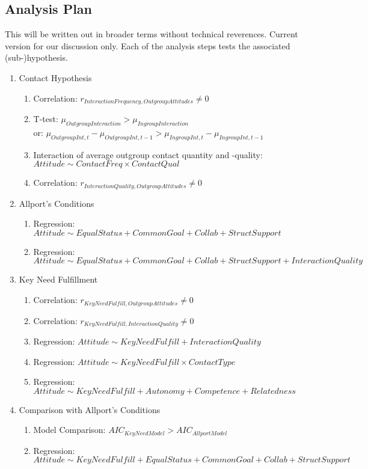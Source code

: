 \documentclass[nobib]{tufte-handout}
\theoremstyle{break}
\theoremstyle{plain}
\begin{document}
\subsection{Analysis Plan}
This will be written out in broader terms without technical reverences. Current version for our discussion only.
Each of the analysis steps tests the associated (sub-)hypothesis.
\begin{enumerate}
    \item Contact Hypothesis
    \begin{enumerate}
        \item Correlation: $r_{InteractionFrequency, OutgroupAttitudes} \neq 0$  
        \item T-test: $\mu_{OutgroupInteraction} > \mu_{IngroupInteraction}$ \\ 
            \hspace{.75em}or: $\mu_{OutgroupInt, t} - \mu_{OutgroupInt, t-1} > \mu_{IngroupInt, t} - \mu_{IngroupInt, t-1}$
        \item Interaction of average outgroup contact quantity and -quality: \\
            \hspace{.75em}$Attitude \sim ContactFreq \times ContactQual$
        \item Correlation: $r_{InteractionQuality, OutgroupAttitudes} \neq 0$
    \end{enumerate}
    \item Allport's Conditions
    \begin{enumerate}
        \item Regression: $Attitude \sim EqualStatus + CommonGoal + Collab + StructSupport$
        \item Regression: $Attitude \sim EqualStatus + CommonGoal + Collab + StructSupport + InteractionQuality$
    \end{enumerate}
    \item Key Need Fulfillment
    \begin{enumerate}
        \item Correlation: $r_{KeyNeedFulfill, OutgroupAttitudes} \neq 0$  
        \item Correlation: $r_{KeyNeedFulfill, InteractionQuality} \neq 0$  
        \item Regression: $Attitude \sim KeyNeedFulfill + InteractionQuality$
        \item Regression: $Attitude \sim KeyNeedFulfill \times ContactType$
        \item Regression: $Attitude \sim KeyNeedFulfill + Autonomy + Competence + Relatedness$
    \end{enumerate}
    \item Comparison with Allport's Conditions
    \begin{enumerate}
        \item Model Comparison: $AIC_{KeyNeedModel} > AIC_{AllportModel}$  
        \item Regression: $Attitude \sim KeyNeedFulfill + EqualStatus + CommonGoal + Collab + StructSupport$
    \end{enumerate}
\end{enumerate}
\end{document}

